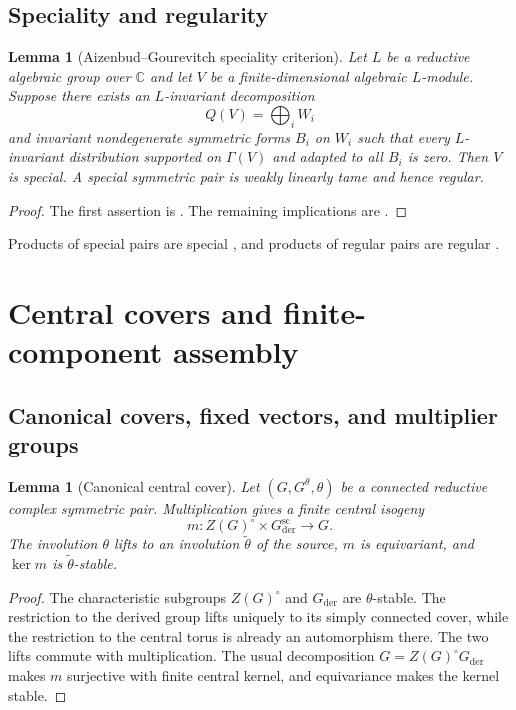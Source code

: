 \documentclass[10pt,a4paper]{amsart}
\numberwithin{equation}{section}
\newtheorem{lemma}[theorem]{Lemma}
\newcommand{\C}{\mathbb C}
\begin{document}
\subsection{Speciality and regularity}

\begin{lemma}[Aizenbud--Gourevitch speciality criterion]
\label{core:lem:speciality-criterion}
Let $L$ be a reductive algebraic group over $\C$ and let $V$ be a
finite-dimensional algebraic $L$-module.  Suppose there exists an
$L$-invariant decomposition
\[
 Q(V)=\bigoplus_i W_i
\]
and invariant nondegenerate symmetric forms $B_i$ on $W_i$ such that every
$L$-invariant distribution supported on $\Gamma(V)$ and adapted to all $B_i$
is zero.  Then $V$ is special.  A special symmetric pair is weakly linearly
tame and hence regular.
\end{lemma}

\begin{proof}
The first assertion is \cite[Lemma~6.0.10]{AG09}.  The remaining implications
are \cite[Proposition~7.3.5 and Remark~7.4.3]{AG09}.
\end{proof}

Products of special pairs are special
\cite[Proposition~7.3.6]{AG09}, and products of regular pairs are regular
\cite[Proposition~7.4.4]{AG09}.


\section{Central covers and finite-component assembly}\label{sec:component-assembly}

\subsection{Canonical covers, fixed vectors, and multiplier groups}

\begin{lemma}[Canonical central cover]\label{lem:canonical-cover}
Let $(G,G^\theta,\theta)$ be a connected reductive complex symmetric pair.
Multiplication gives a finite central isogeny
\[
 m:Z(G)^\circ\times G_{\mathrm{der}}^{\mathrm{sc}}\longrightarrow G.
\]
The involution $\theta$ lifts to an involution $\widetilde\theta$ of the source,
$m$ is equivariant, and $\ker m$ is $\widetilde\theta$-stable.
\end{lemma}

\begin{proof}
The characteristic subgroups $Z(G)^\circ$ and $G_{\mathrm{der}}$ are
$\theta$-stable.  The restriction to the derived group lifts uniquely to its
simply connected cover, while the restriction to the central torus is already
an automorphism there.  The two lifts commute with multiplication.  The usual
decomposition $G=Z(G)^\circ G_{\mathrm{der}}$ makes $m$ surjective with finite
central kernel, and equivariance makes the kernel stable.
\end{proof}
\end{document}

